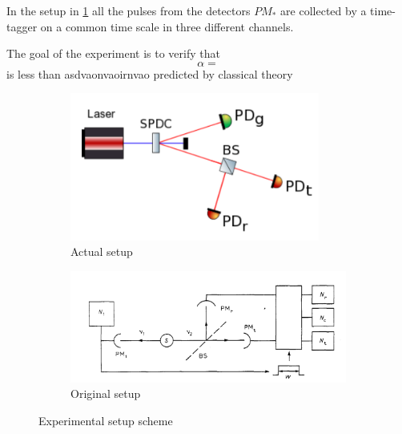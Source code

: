 \documentclass[10pt, final]{article}
\begin{document}
\begin{multicols}{2}
In the setup in \ref{our} all the pulses from the detectors $PM_*$ are collected by a time-tagger on a common time scale in three different channels.

The goal of the experiment is to verify that 
\begin{equation}
    \alpha = 
\end{equation}
is less than asdvaonvaoirnvao predicted by classical theory

\begin{mdframed}
    \begin{figure}[H]
        \begin{subfigure}{\textwidth}
            \centering
            \includegraphics[width = 0.9\textwidth]{../images/our_setup.png}
            \caption{Actual setup}
            \label{our}
        \end{subfigure}

        \begin{subfigure}{\textwidth}
            \centering
            \includegraphics[width = \textwidth]{../images/original.png}
            \caption{Original setup}
        \end{subfigure}
        \caption{Experimental setup scheme}
    \end{figure}
\end{mdframed}


\end{multicols}
\end{document}
